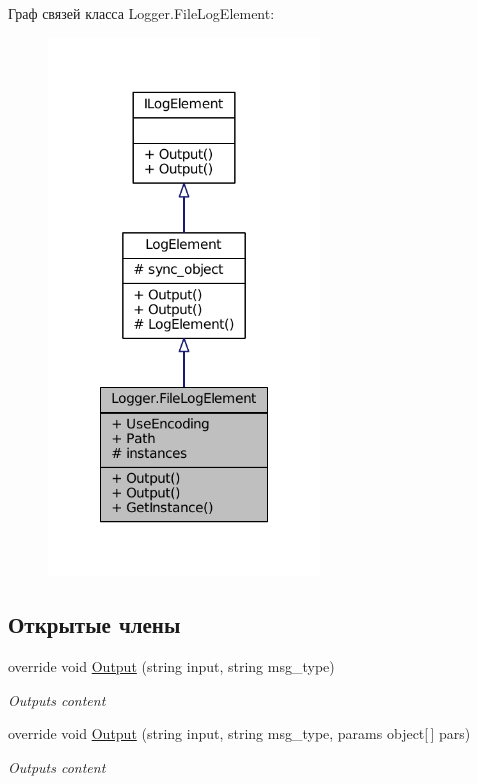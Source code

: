 Граф связей класса Logger.\+File\+Log\+Element\+:
\nopagebreak
\begin{figure}[H]
\begin{center}
\leavevmode
\includegraphics[width=204pt]{class_logger_1_1_file_log_element__coll__graph}
\end{center}
\end{figure}
\subsection*{Открытые члены}
\begin{DoxyCompactItemize}
\item 
override void \hyperlink{class_logger_1_1_file_log_element_a8c411673dca056803a65363a8a64e1f7}{Output} (string input, string msg\+\_\+type)
\begin{DoxyCompactList}\small\item\em Outputs content \end{DoxyCompactList}\item 
override void \hyperlink{class_logger_1_1_file_log_element_aa5ec6e083f5ed5f08e56971efa676833}{Output} (string input, string msg\+\_\+type, params object\mbox{[}$\,$\mbox{]} pars)
\begin{DoxyCompactList}\small\item\em Outputs content \end{DoxyCompactList}\end{DoxyCompactItemize}
